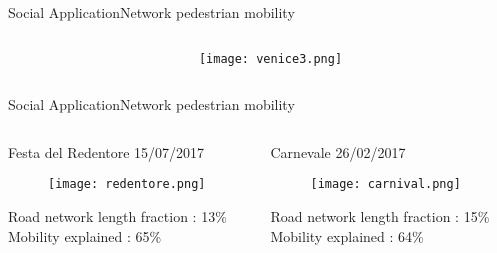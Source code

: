 \documentclass{standalone}
\begin{document}
\begin{frame}{Social Application}{Network pedestrian mobility}
\begin{columns}
\begin{column}{0.4\linewidth}
  \end{column}

  \begin{column}{0.6\linewidth}
    \begin{figure}
      \centering
      \texttt{[image: venice3.png]}
    \end{figure}
  \end{column}

\end{columns}

\end{frame}



\begin{frame}{Social Application}{Network pedestrian mobility}

  \begin{columns}

    \begin{column}{0.5\linewidth}

      Festa del Redentore 15/07/2017

      \begin{figure}
        \centering
        \texttt{[image: redentore.png]}
      \end{figure}

      Road network length fraction : 13\%
      Mobility explained : 65\%


    \end{column}

    \begin{column}{0.5\linewidth}

      Carnevale 26/02/2017

      \begin{figure}
        \centering
        \texttt{[image: carnival.png]}
      \end{figure}

      Road network length fraction : 15\%
      Mobility explained : 64\%

    \end{column}

  \end{columns}

\end{frame}
\end{document}
